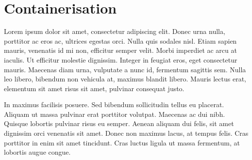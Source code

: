 \section{ Containerisation }


Lorem ipsum dolor sit amet, consectetur adipiscing elit. Donec urna nulla, porttitor ac eros ac, ultrices egestas orci. 
Nulla quis sodales nisl. Etiam sapien mauris, venenatis id mi non, efficitur semper velit. Morbi imperdiet ac arcu at iaculis. 
Ut efficitur molestie dignissim. Integer in feugiat eros, eget consectetur mauris. Maecenas diam urna, vulputate a nunc id, fermentum sagittis sem. 
Nulla leo libero, bibendum non vehicula at, maximus blandit libero. Mauris lectus erat, elementum sit amet risus sit amet, pulvinar consequat justo. 


In maximus facilisis posuere. Sed bibendum sollicitudin tellus eu placerat. 
Aliquam ut massa pulvinar erat porttitor volutpat. Maecenas ac dui nibh. Quisque lobortis pulvinar risus eu semper. 
Aenean aliquam dui felis, sit amet dignissim orci venenatis sit amet. 
Donec non maximus lacus, at tempus felis. Cras porttitor in enim sit amet tincidunt. 
Cras luctus ligula ut massa fermentum, at lobortis augue congue. 

\pagebreak
